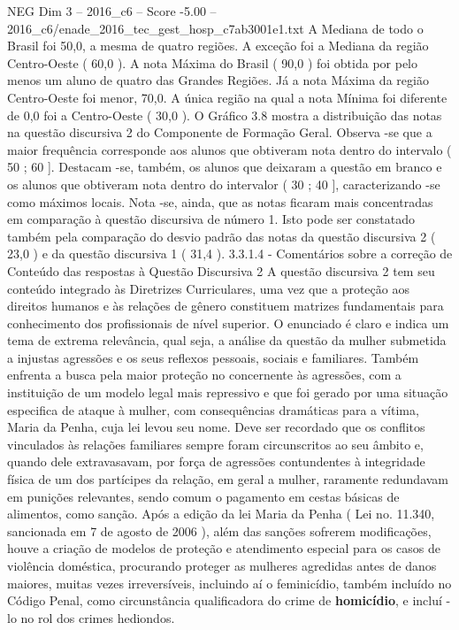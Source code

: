 \begin{textsample}{NEG Dim 3 – 2016\_c6 – Score -5.00 – 2016\_c6/enade\_2016\_tec\_gest\_hosp\_c7ab3001e1.txt}
A Mediana de todo o Brasil foi 50,0, a mesma de quatro regiões.
A exceção foi a Mediana da região Centro-Oeste ( 60,0 ).
A nota Máxima do Brasil ( 90,0 ) foi obtida por pelo menos um aluno de quatro das Grandes Regiões.
Já a nota Máxima da região Centro-Oeste foi menor, 70,0.
A única região na qual a nota Mínima foi diferente de 0,0 foi a Centro-Oeste ( 30,0 ).
O Gráfico 3.8 mostra a distribuição das notas na questão discursiva 2 do Componente de Formação Geral.
Observa -se que a maior frequência corresponde aos alunos que obtiveram nota dentro do intervalo ( 50 ; 60 ].
Destacam -se, também, os alunos que deixaram a questão em branco e os alunos que obtiveram nota dentro do intervalor ( 30 ; 40 ], caracterizando -se como máximos locais.
Nota -se, ainda, que as notas ficaram mais concentradas em comparação à questão discursiva de número 1.
Isto pode ser constatado também pela comparação do desvio padrão das notas da questão discursiva 2 ( 23,0 ) e da questão discursiva 1 ( 31,4 ). 3.3.1.4 - Comentários sobre a correção de Conteúdo das respostas à Questão Discursiva 2 A questão discursiva 2 tem seu conteúdo integrado às Diretrizes Curriculares, uma vez que a proteção aos direitos humanos e às relações de gênero constituem matrizes fundamentais para conhecimento dos profissionais de nível superior.
O enunciado é claro e indica um tema de extrema relevância, qual seja, a análise da questão da mulher submetida a injustas agressões e os seus reflexos pessoais, sociais e familiares.
Também enfrenta a busca pela maior proteção no concernente às agressões, com a instituição de um modelo legal mais repressivo e que foi gerado por uma situação especifica de ataque à mulher, com consequências dramáticas para a vítima, Maria da Penha, cuja lei levou seu nome.
Deve ser recordado que os conflitos vinculados às relações familiares sempre foram circunscritos ao seu âmbito e, quando dele extravasavam, por força de agressões contundentes à integridade física de um dos partícipes da relação, em geral a mulher, raramente redundavam em punições relevantes, sendo comum o pagamento em cestas básicas de alimentos, como sanção.
Após a edição da lei Maria da Penha ( Lei no. 11.340, sancionada em 7 de agosto de 2006 ), além das sanções sofrerem modificações, houve a criação de modelos de proteção e atendimento especial para os casos de violência doméstica, procurando proteger as mulheres agredidas antes de danos maiores, muitas vezes irreversíveis, incluindo aí o feminicídio, também incluído no Código Penal, como circunstância qualificadora do crime de \textbf{homicídio}, e incluí -lo no rol dos crimes hediondos.

\end{textsample}
